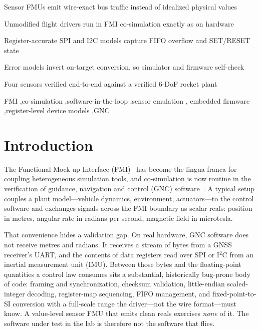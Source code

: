 \documentclass[preprint,12pt,a4paper]{elsarticle}
\begin{document}
\begin{frontmatter}
\begin{highlights}
\item Sensor FMUs emit wire-exact bus traffic instead of idealized physical values
\item Unmodified flight drivers run in FMI co-simulation exactly as on hardware
\item Register-accurate SPI and I2C models capture FIFO overflow and SET/RESET state
\item Error models invert on-target conversion, so simulator and firmware self-check
\item Four sensors verified end-to-end against a verified 6-DoF rocket plant
\end{highlights}

\begin{keyword}
FMI \sep co-simulation \sep software-in-the-loop \sep sensor emulation \sep
embedded firmware \sep register-level device models \sep GNC
\end{keyword}

\end{frontmatter}

\linenumbers

\section{Introduction}
The Functional Mock-up Interface (FMI)~\cite{fmi2020,blochwitz2011fmi} has
become the lingua franca for coupling heterogeneous simulation tools, and
co-simulation is now routine in the verification of guidance, navigation and
control (GNC) software~\cite{gomes2018cosim}. A typical setup couples a plant
model---vehicle dynamics, environment, actuators---to the control software and
exchanges signals across the FMI boundary as scalar reals: position in metres,
angular rate in radians per second, magnetic field in microtesla.

That convenience hides a validation gap. On real hardware, GNC software does not
receive metres and radians. It receives a stream of bytes from a GNSS receiver's
UART, and the contents of data registers read over SPI or I$^2$C from an
inertial measurement unit (IMU). Between those bytes and the floating-point
quantities a control law consumes sits a substantial, historically bug-prone
body of code: framing and synchronization, checksum validation, little-endian
scaled-integer decoding, register-map sequencing, FIFO management, and
fixed-point-to-SI conversion with a full-scale range the driver---not the wire
format---must know. A value-level sensor FMU that emits clean reals exercises
\emph{none} of it. The software under test in the lab is therefore not the
software that flies.
\end{document}
